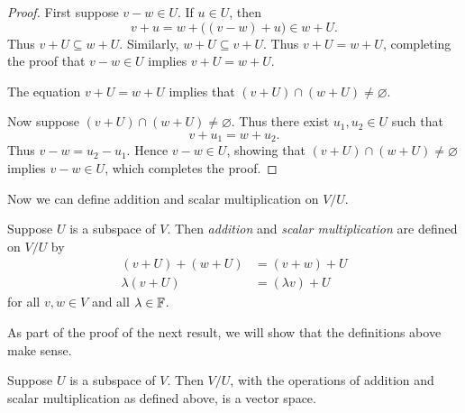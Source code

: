 \begin{proof}
First suppose $v-w\in U$. If $u\in U$, then
\[ v+u = w+\bigl((v-w)+u\bigr)\in w+U. \]
Thus $v+U\subseteq w+U$. Similarly, $w+U\subseteq v+U$. Thus $v+U=w+U$,
completing the proof that $v-w\in U$ implies $v+U=w+U$.

The equation $v+U=w+U$ implies that $(v+U)\cap(w+U)\ne\varnothing$.

Now suppose $(v+U)\cap(w+U)\ne\varnothing$. Thus there exist $u_1,u_2\in U$
such that
\[ v+u_1 = w+u_2. \]
Thus $v-w=u_2-u_1$. Hence $v-w\in U$, showing that
$(v+U)\cap(w+U)\ne\varnothing$ implies $v-w\in U$, which completes the proof.
\end{proof}

Now we can define addition and scalar multiplication on $V/U$.

\begin{definition}\label{ax:3.102}
Suppose $U$ is a subspace of $V$. Then \emph{addition} and \emph{scalar
multiplication} are defined on $V/U$ by
\begin{align*}
(v+U)+(w+U) &= (v+w)+U\\
\lambda(v+U) &= (\lambda v)+U
\end{align*}
for all $v,w\in V$ and all $\lambda\in\mathbb{F}$.
\end{definition}

As part of the proof of the next result, we will show that the definitions above
make sense.

\begin{result}\label{ax:3.103}
Suppose $U$ is a subspace of $V$. Then $V/U$, with the operations of addition
and scalar multiplication as defined above, is a vector space.
\end{result}

